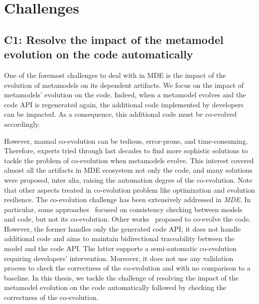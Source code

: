 \section{Challenges}
\label{challenges}
\subsection*{C1: Resolve the impact of the metamodel evolution on the code automatically}
\label{C1}
One of the foremost challenges to deal with in MDE is the impact of the evolution of metamodels on its dependent artifacts. We focus on the impact of metamodels' evolution on the code. 
Indeed, when a metamodel evolves and the code API is regenerated again, the additional code implemented by developers can be impacted.
	As a consequence, this additional code must be co-evolved accordingly.%

However, manual co-evolution can be tedious, error-prone, and time-consuming. %
Therefore, experts tried through last decades to find more sophistic solutions to tackle the problem of co-evolution when metamodels evolve. This interest covered almost all the artifacts in MDE ecosystem not only the code, and many solutions were proposed, inter alia, raising the automation degree of the co-evolution. Note that other aspects treated in co-evolution problem like optimization and evolution resilience.
The co-evolution challenge has been extensively addressed in \emph{MDE}. 
In particular, some approaches~\cite{riedl2014towards,kanakis2019empirical,pham2017bidirectional,jongeling2020towards,jongeling2022Structural,zaheri2021towards} focused on consistency checking between models and code, but not its co-evolution.
Other works~\cite{yu2012maintaining,Khelladi2020} proposed to co-evolve the code. However, the former handles only the generated code API, it does not handle additional code and aims to maintain bidirectional traceability between the model and the code API. The latter supports a semi-automatic co-evolution requiring developers' intervention. Moreover, it does not use any validation process to check the correctness of the co-evolution and with no comparison to a baseline. In this thesis, we tackle the challenge of resolving the impact of the metamodel evolution on the code automatically followed by checking the correctness of the co-evolution.

